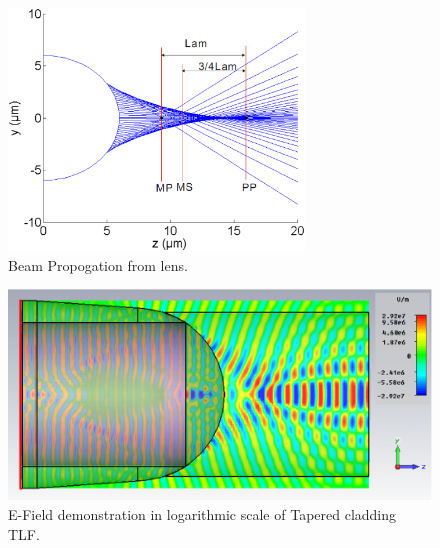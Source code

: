 \begin{figure}[!ht]
\centering
	\includegraphics[width=0.7\textwidth]{bilder/cal_min_spot}
\caption{Beam Propogation from lens.}
\label{fig:lens_spot}
\end{figure}
\begin{figure}[!ht]
	\centering
		\includegraphics[width=0.7 \textwidth]{bilder/cst_lensed_fiber_equ_efield}
		\caption{E-Field demonstration in logarithmic scale of Tapered cladding TLF.}
 		\label{fig:Tapered_cladding_efield}
\end{figure}

